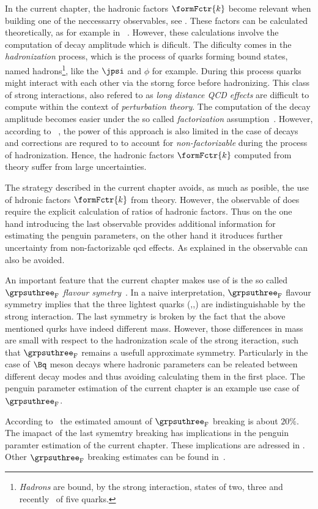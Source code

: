 In the current chapter, the hadronic factors $\formFctr{k}$ become relevant when building
one of the neccessarry observables, see . These factors can be calculated
theoretically, as for example in ~\cite{DeBruyn-thesis}. However, these calculations involve
the computation of \BJpsiX decay amplitude which is dificult. The dificulty comes in the
{\it hadronization} process, which is the process of quarks forming bound states, named
hadrons\footnote{ {\it Hadrons} are bound, by the strong interaction, states of two,
three and recently~\cite{Aaij:2016nsc} of five quarks.}, like the $\jpsi$ and $\phi$ for example.
During this process quarks might interact with each other via the storng force before hadronizing.
This class of strong interactions, also refered to as {\it long distance QCD effects}
are difficult to compute within the context of {\it perturbation theory}.
The computation of the \BJpsiX decay amplitude becomes easier under the so called
{\it factorization} assumption~\cite{HAAN1970448,Wirbel1985,CABIBBO1978418,FAKIROV1978315}.
However, according to ~\cite{DeBruyn-thesis},
the power of this approach is also limited in the case of \BJpsiX decays and corrections
are requred to to account for {\it non-factorizable} during the process of hadronization.
Hence, the hadronic factors $\formFctr{k}$ computed from theory suffer from large uncertainties.

The strategy described in the current chapter avoids, as much as posible, the use of hdronic
factors $\formFctr{k}$ from theory. However, the observable of 
does require the explicit calculation of ratios of hadronic factors. Thus on the one hand
introducing the last observable provides additional information for estimating the penguin
parameters, on the other hand it itroduces further uncertainty from non-factorizable qcd effects.
As explained in  the observable  can also be avoided.

An important feature that the current chapter makes use of is the so called
$\grpsuthree_{\rm F}$ {\it flavour symetry}~\cite{GELLMANN1964214,NEEMAN1961222}.
In a naive interpretation, $\grpsuthree_{\rm F}$ flavour symmetry implies that the three lightest quarks (\uquark,\dquark,\squark)
are indistinguishable by the strong interaction. The last symmetry is broken by the fact that the above
mentioned qurks have indeed different mass. However, those differences in mass are small with respect
to the hadronization scale \lqcd of the strong iteraction, such that $\grpsuthree_{\rm F}$
remains a usefull approximate symmetry. Particularly in the case of $\Bq$ meson decays where hadronic
parameters can be releated between different decay modes and thus avoiding calculating them in the first place.
The penguin parameter estimation of the current chapter is an example use case of $\grpsuthree_{\rm F}$.

According to~\cite{Nagashima:2007qn,Gronau:2013mda} the estimated amount of $\grpsuthree_{\rm F}$ breaking is about $20\%$.
The imapact of the last symemtry breaking has implications in the penguin paramter estimation
of the current chapter. These implications are adressed in .
Other $\grpsuthree_{\rm F}$ breaking estimates can be found in~\cite{Charles:2015gya,PDG}.
